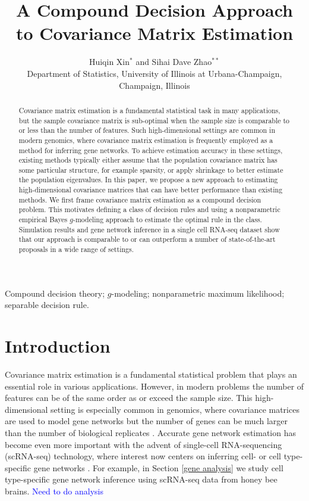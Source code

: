 \documentclass[useAMS,referee,usenatbib]{biom}
\title[Coumpound Decision Covariance Matrix Estimation]{A Compound Decision Approach to Covariance Matrix Estimation}
\author{Huiqin Xin$^{*}$\email{huiqinx2@illinois.edu } and
Sihai Dave Zhao$^{**}$\email{sdzhao@illinois.edu} \\
Department of Statistics, University of Illinois at Urbana-Champaign, Champaign, Illinois}
\def\blue{\textcolor{blue}}
\begin{document}

\label{firstpage}
\begin{abstract}
  Covariance matrix estimation is a fundamental statistical task in many applications, but the sample covariance matrix is sub-optimal when the sample size is comparable to or less than the number of features. Such high-dimensional settings are common in modern genomics, where covariance matrix estimation is frequently employed as a method for inferring gene networks. To achieve estimation accuracy in these settings, existing methods typically either assume that the population covariance matrix has some particular structure, for example sparsity, or apply shrinkage to better estimate the population eigenvalues. In this paper, we propose a new approach to estimating high-dimensional covariance matrices that can have better performance than existing methods. We first frame covariance matrix estimation as a compound decision problem. This motivates defining a class of decision rules and using a nonparametric empirical Bayes $g$-modeling approach to estimate the optimal rule in the class. Simulation results and gene network inference in a single cell RNA-seq dataset show that our approach is comparable to or can outperform a number of state-of-the-art proposals in a wide range of settings.
\end{abstract}

\begin{keywords}
Compound decision theory; $g$-modeling; nonparametric maximum likelihood; separable decision rule.
\end{keywords}

\maketitle

\section{Introduction}
\label{introduction}

Covariance matrix estimation is a fundamental statistical problem that plays an essential role in various applications. However, in modern problems the number of features can be of the same order as or exceed the sample size. This high-dimensional setting is especially common in genomics, where covariance matrices are used to model gene networks but the number of genes can be much larger than the number of biological replicates \citep{schafer2005shrinkage, markowetz2007inferring}. Accurate gene network estimation has become even more important with the advent of single-cell RNA-sequencing (scRNA-seq) technology, where interest now centers on inferring cell- or cell type-specific gene networks \citep{aibar2017scenic, dai2019cell, stegle2015computational}. For example, in Section \ref{gene analysis} we study cell type-specific gene network inference using scRNA-seq data from honey bee brains. \blue{Need to do analysis}
\end{document}

